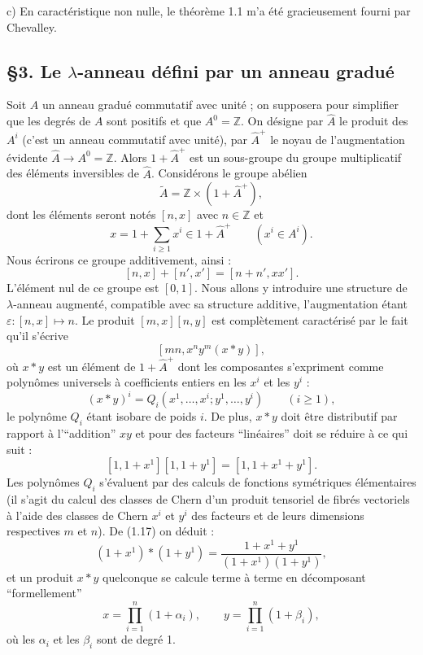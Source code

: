 \documentclass[11pt]{article}
\providecommand{\Z}{\mathbb Z}
\providecommand{\Ahat}{\widehat A}
\providecommand{\Ahp}{\widehat A^{+}}
\begin{document}
c) En caractéristique non nulle, le théorème 1.1 m'a été gracieusement fourni par Chevalley.

\subsection*{\S 3. Le $\lambda$-anneau défini par un anneau gradué}

Soit $A$ un anneau gradué commutatif avec unité ; on supposera pour simplifier que les degrés de $A$ sont positifs et que $A^0=\Z$. On désigne par $\Ahat$ le produit des $A^i$ (c'est un anneau commutatif avec unité), par $\Ahp$ le noyau de l'augmentation évidente $\Ahat\to A^0=\Z$. Alors $1+\Ahp$ est un sous-groupe du groupe multiplicatif des éléments inversibles de $\Ahat$. Considérons le groupe abélien
\begin{equation}\tag{1.14}
\widetilde A=\Z\times(1+\Ahp),
\end{equation}
dont les éléments seront notés $[n,x]$ avec $n\in\Z$ et
\[
x=1+\sum_{i\geq 1}x^i\in1+\Ahp\qquad (x^i\in A^i).
\]
Nous écrirons ce groupe additivement, ainsi :
\begin{equation}\tag{1.15}
[n,x]+[n',x']=[n+n',xx'].
\end{equation}
L'élément nul de ce groupe est $[0,1]$. Nous allons y introduire une structure de $\lambda$-anneau augmenté, compatible avec sa structure additive, l'augmentation étant $\varepsilon:[n,x]\mapsto n$. Le produit $[m,x][n,y]$ est complètement caractérisé par le fait qu'il s'écrive
\[
[mn,x^n y^m(x*y)],
\]
où $x*y$ est un élément de $1+\Ahp$ dont les composantes s'expriment comme polynômes universels à coefficients entiers en les $x^i$ et les $y^i$ :
\begin{equation}\tag{1.16}
(x*y)^i=Q_i(x^1,\ldots,x^i;y^1,\ldots,y^i)\qquad (i\geq1),
\end{equation}
le polynôme $Q_i$ étant isobare de poids $i$. De plus, $x*y$ doit être distributif par rapport à l'``addition'' $xy$ et pour des facteurs ``linéaires'' doit se réduire à ce qui suit :
\begin{equation}\tag{1.17}
[1,1+x^1][1,1+y^1]=[1,1+x^1+y^1].
\end{equation}
Les polynômes $Q_i$ s'évaluent par des calculs de fonctions symétriques élémentaires (il s'agit du calcul des classes de Chern d'un produit tensoriel de fibrés vectoriels à l'aide des classes de Chern $x^i$ et $y^i$ des facteurs et de leurs dimensions respectives $m$ et $n$). De (1.17) on déduit :
\begin{equation}\tag{1.17 bis}
(1+x^1)*(1+y^1)=\frac{1+x^1+y^1}{(1+x^1)(1+y^1)},
\end{equation}
et un produit $x*y$ quelconque se calcule terme à terme en décomposant ``formellement''
\[
x=\prod_{i=1}^n(1+\alpha_i),\qquad y=\prod_{i=1}^n(1+\beta_i),
\]
où les $\alpha_i$ et les $\beta_i$ sont de degré 1.
\end{document}
